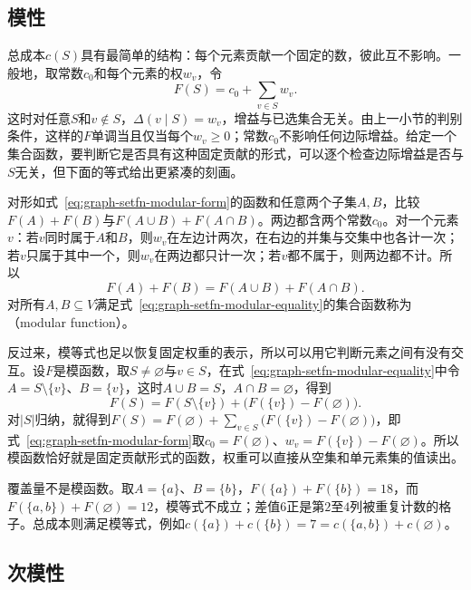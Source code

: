 \subsection{模性}
\label{sec:graph-setfn-modularity}

总成本$c(S)$具有最简单的结构：每个元素贡献一个固定的数，彼此互不影响。一般地，取常数$c_0$和每个元素的权$w_v$，令
\begin{equation}
  F(S)=c_0+\sum_{v\in S}w_v .
  \label{eq:graph-setfn-modular-form}
\end{equation}
这时对任意$S$和$v\notin S$，$\Delta(v\mid S)=w_v$，增益与已选集合无关。由上一小节的判别条件，这样的$F$单调当且仅当每个$w_v\geq0$；常数$c_0$不影响任何边际增益。给定一个集合函数，要判断它是否具有这种固定贡献的形式，可以逐个检查边际增益是否与$S$无关，但下面的等式给出更紧凑的刻画。

对形如式~\eqref{eq:graph-setfn-modular-form}的函数和任意两个子集$A,B$，比较$F(A)+F(B)$与$F(A\cup B)+F(A\cap B)$。两边都含两个常数$c_0$。对一个元素$v$：若$v$同时属于$A$和$B$，则$w_v$在左边计两次，在右边的并集与交集中也各计一次；若$v$只属于其中一个，则$w_v$在两边都只计一次；若$v$都不属于，则两边都不计。所以
\begin{equation}
  F(A)+F(B)=F(A\cup B)+F(A\cap B).
  \label{eq:graph-setfn-modular-equality}
\end{equation}
对所有$A,B\subseteq V$满足式~\eqref{eq:graph-setfn-modular-equality}的集合函数称为（modular function）。

反过来，模等式也足以恢复固定权重的表示，所以可以用它判断元素之间有没有交互。设$F$是模函数，取$S\neq\varnothing$与$v\in S$，在式~\eqref{eq:graph-setfn-modular-equality}中令$A=S\setminus\{v\}$、$B=\{v\}$，这时$A\cup B=S$，$A\cap B=\varnothing$，得到
\[
  F(S)=F(S\setminus\{v\})+\bigl(F(\{v\})-F(\varnothing)\bigr).
\]
对$|S|$归纳，就得到$F(S)=F(\varnothing)+\sum_{v\in S}\bigl(F(\{v\})-F(\varnothing)\bigr)$，即式~\eqref{eq:graph-setfn-modular-form}取$c_0=F(\varnothing)$、$w_v=F(\{v\})-F(\varnothing)$。所以模函数恰好就是固定贡献形式的函数，权重可以直接从空集和单元素集的值读出。

覆盖量不是模函数。取$A=\{a\}$、$B=\{b\}$，$F(\{a\})+F(\{b\})=18$，而$F(\{a,b\})+F(\varnothing)=12$，模等式不成立；差值$6$正是第$2$至$4$列被重复计数的格子。总成本则满足模等式，例如$c(\{a\})+c(\{b\})=7=c(\{a,b\})+c(\varnothing)$。

\subsection{次模性}
\label{sec:graph-setfn-submodularity}

